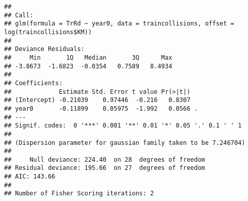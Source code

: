 \documentclass[12pt,hyperref,]{ctexart}
\begin{document}
\begin{verbatim}
## 
## Call:
## glm(formula = TrRd ~ year0, data = traincollisions, offset = log(traincollisions$KM))
## 
## Deviance Residuals: 
##     Min       1Q   Median       3Q      Max  
## -3.8673  -1.6823  -0.0354   0.7589   8.4934  
## 
## Coefficients:
##             Estimate Std. Error t value Pr(>|t|)  
## (Intercept) -0.21039    0.97446  -0.216   0.8307  
## year0       -0.11899    0.05975  -1.992   0.0566 .
## ---
## Signif. codes:  0 '***' 0.001 '**' 0.01 '*' 0.05 '.' 0.1 ' ' 1
## 
## (Dispersion parameter for gaussian family taken to be 7.246704)
## 
##     Null deviance: 224.40  on 28  degrees of freedom
## Residual deviance: 195.66  on 27  degrees of freedom
## AIC: 143.66
## 
## Number of Fisher Scoring iterations: 2
\end{verbatim}
\end{document}
